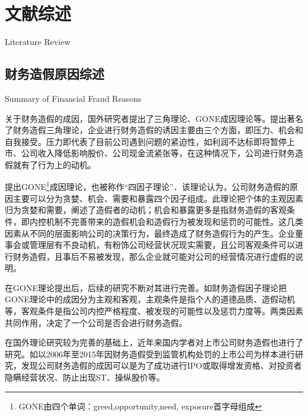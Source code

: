 \chapter{文献综述}{Literature Review}


\section{财务造假原因综述}{Summary of Financial Fraud Reasons}

关于财务造假的成因，国外研究者提出了三角理论、GONE成因理论等。\citep{cresscy1973other}提出著名了财务造假三角理论，企业进行财务造假的诱因主要由三个方面，即压力、机会和自我接受。压力即代表了目前公司遇到问题的紧迫性，如利润不达标即将暂停上市、公司收入降低影响股价、公司现金流紧张等，在这种情况下，公司进行财务造假就有了行为上的动机。


\citep{bologna1993accountant}提出GONE\footnote{GONE由四个单词：greed,opportunity,need, exposure首字母组成}成因理论，也被称作“四因子理论”．该理论认为，公司财务造假的原因主要可以分为贪婪、机会、需要和暴露四个因子组成。此理论把个体的主观因素归为贪婪和需要，阐述了造假者的动机；机会和暴露更多是指财务造假的客观条件，即内控机制不完善带来的造假机会和造假行为被发现和惩罚的可能性。这几类因素从不同的层面影响公司的决策行为，最终造成了财务造假行为的产生。企业董事会或管理层有不良动机，有粉饰公司经营状况现实需要，且公司客观条件可以进行财务造假，且事后不易被发现，那么企业就可能对公司的经营情况进行虚假的说明。

在GONE理论提出后，后续的研究不断对其进行完善。如财务造假因子理论把GONE理论中的成因分为主观和客观，主观条件是指个人的道德品质、造假动机等，客观条件是指公司内控严格程度、被发现的可能性以及惩罚力度等。两类因素共同作用，决定了一个公司是否会进行财务造假。

在国外理论研究较为完善的基础上，近年来国内学者对上市公司财务造假也进行了研究。如\citep{Mei}以2006年至2015年因财务造假受到监管机构处罚的上市公司为样本进行研究，发现公司财务造假的成因可以是为了成功进行IPO或取得增发资格、对投资者隐瞒经营状况、防止出现ST、操纵股价等。


